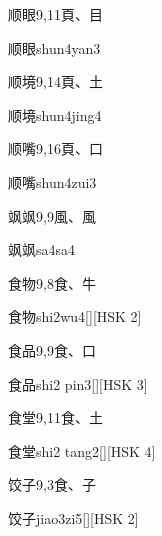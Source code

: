 \begin{entry}{顺眼}{9,11}{⾴、⽬}
  \begin{phonetics}{顺眼}{shun4yan3}
  \end{phonetics}
\end{entry}

\begin{entry}{顺境}{9,14}{⾴、⼟}
  \begin{phonetics}{顺境}{shun4jing4}
  \end{phonetics}
\end{entry}

\begin{entry}{顺嘴}{9,16}{⾴、⼝}
  \begin{phonetics}{顺嘴}{shun4zui3}
  \end{phonetics}
\end{entry}

\begin{entry}{飒飒}{9,9}{⾵、⾵}
  \begin{phonetics}{飒飒}{sa4sa4}
  \end{phonetics}
\end{entry}

\begin{entry}{食物}{9,8}{⾷、⽜}
  \begin{phonetics}{食物}{shi2wu4}[][HSK 2]
  \end{phonetics}
\end{entry}

\begin{entry}{食品}{9,9}{⾷、⼝}
  \begin{phonetics}{食品}{shi2 pin3}[][HSK 3]
  \end{phonetics}
\end{entry}

\begin{entry}{食堂}{9,11}{⾷、⼟}
  \begin{phonetics}{食堂}{shi2 tang2}[][HSK 4]
  \end{phonetics}
\end{entry}

\begin{entry}{饺子}{9,3}{⾷、⼦}
  \begin{phonetics}{饺子}{jiao3zi5}[][HSK 2]
  \end{phonetics}
\end{entry}

